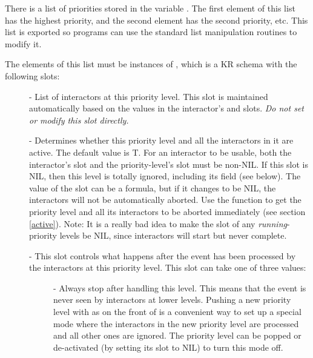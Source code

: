 There is a list of priorities stored in the variable
.  The first element of this list has the
highest priority, and the second element has the second priority, etc.
This list is exported so programs can use the standard list manipulation
routines to modify it.

The elements of this list must be
instances of , which is a KR schema with the
following slots:
\begin{description}
\item[] 
- List of interactors at this priority level.  This slot is maintained
automatically based on the values in the interactor's
 and  slots.  {\it Do not set
or modify this slot directly.}

\item[] 
- Determines whether this priority level and all the interactors in it are
active.  The default value is T.
For an interactor to be usable, both the interactor's 
slot and the priority-level's  slot must be non-NIL.
If this slot is NIL, then this level is totally ignored, including its
 field (see below).  The value of the  slot can
be a formula, but
if it changes to be NIL, the interactors will not be automatically aborted.  Use
the  function to get the priority level and all its
interactors to be aborted immediately (see section \ref{active}).
Note: It is a really bad idea to make
the  slot of any {\it running}-priority levels be NIL, since
interactors will start but never complete.

\item[] 
- This slot controls what happens after the event has been processed by the
interactors at this priority level.  This slot can take one of three
values:
\begin{description}
\item[] 
- Always stop after handling this level.  This means that the event is
never seen by interactors at lower levels.  Pushing a new priority level
with  as  on the front of 
is a convenient way to set up a special mode where the interactors in the
new priority level are processed and all other ones are ignored.  The
priority level can be popped or de-activated (by setting its 
slot to NIL) to turn this mode off.


\end{description}
\end{description}
